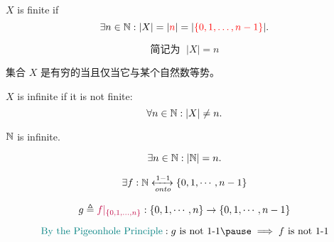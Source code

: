 \begin{frame}{}
  \begin{definition}[Finite]
    $X$ is finite if
    \[
      \exists n \in \mathbb{N}: |X| = |\textcolor{red}{n}| = |\textcolor{red}{\{0, 1, \dots, n-1\}}|.
    \]
  \end{definition}

  \pause
  \vspace{0.20cm}
  \[
    \text{简记为 }\; |X| = n
  \]

  \pause
  \vspace{0.30cm}
  \begin{center}
    集合 $X$ 是有穷的当且仅当它与某个自然数等势。
  \end{center}


\end{frame}

\begin{frame}{}
  \begin{definition}[Infinite]
    $X$ is infinite if it is not finite:
    \[
      \forall n \in \mathbb{N}: |X| \neq n.
    \]
  \end{definition}

  \pause
  \begin{theorem}
    $\mathbb{N}$ is infinite. 
  \end{theorem}

  \pause
  \begin{center}

    \pause
    \vspace{-0.30cm}
    \[
      \exists n \in \mathbb{N}: |\mathbb{N}| = n.
    \]

    \pause
    \vspace{-0.30cm}
    \[
      \exists f: \mathbb{N} \xleftrightarrow[onto]{1-1} \{0, 1, \cdots, n-1\}
    \]

    \pause
    \vspace{-0.30cm}
    \[
      g \triangleq \textcolor{purple}{f|_{\{0, 1, \ldots, n\}}}: \{0, 1, \cdots, n\} \to \{0, 1, \cdots, n-1\}
    \]

    \pause
    \vspace{-0.30cm}
    \[
      \text{\teal{By the Pigeonhole Principle}}: g \text{ is not 1-1} \pause \implies f \text{ is not 1-1}
    \]
  \end{center}
\end{frame}

